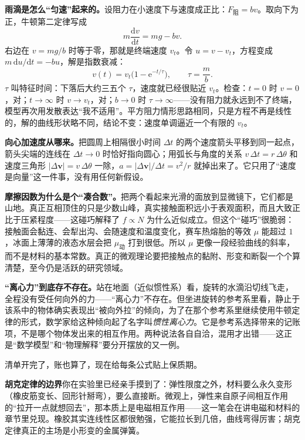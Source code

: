 \begin{mathbridge}
\textbf{雨滴是怎么“匀速”起来的。}设阻力在小速度下与速度成正比：\(F_{\text{阻}}=bv\)。取向下为正，牛顿第二定律写成
\[
m\frac{\mathrm dv}{\mathrm dt}=mg-bv .
\]
右边在 \(v=mg/b\) 时等于零，那就是终端速度 \(v_t\)。令 \(u=v-v_t\)，方程变成 \(m\,\mathrm du/\mathrm dt=-bu\)，解是指数衰减：
\[
v(t)=v_t\bigl(1-\mathrm e^{-t/\tau}\bigr),\qquad \tau=\frac{m}{b}.
\]
\(\tau\) 叫特征时间：下落后大约三五个 \(\tau\)，速度就已经很贴近 \(v_t\)。检查：\(t=0\) 时 \(v=0\)，对；\(t\to\infty\) 时 \(v\to v_t\)，对；\(b\to0\) 时 \(\tau\to\infty\)——没有阻力就永远到不了终端，模型再次用发散表达“我不适用”。平方阻力情形思路相同，只是方程不再是线性的，解的曲线形状略不同，结论不变：速度单调逼近一个有限的 \(v_t\)。

\textbf{向心加速度从哪来。}把圆周上相隔很小时间 \(\Delta t\) 的两个速度箭头平移到同一起点，箭头尖端的连线在 \(\Delta t\to0\) 时恰好指向圆心；用弧长与角度的关系 \(v\,\Delta t=r\,\Delta\theta\) 和速度三角形 \(|\Delta\bm v|=v\,\Delta\theta\) 一除，\(a=|\Delta\bm v|/\Delta t=v^2/r\) 就掉出来了。它只用了“速度是向量”这一件事，没有用任何新假设。
\end{mathbridge}

\begin{challenge}
\textbf{摩擦因数为什么是个“凑合数”。}把两个看起来光滑的面放到显微镜下，它们都是山地。真正互相顶住的只是少数山峰，真实接触面积远小于表观面积，而且大致正比于压紧程度——这碰巧解释了 \(f\propto N\) 为什么近似成立。但这个“碰巧”很脆弱：接触面会黏连、会犁出沟、会随速度和温度变化，赛车热熔胎的等效 \(\mu\) 能超过 \(1\)，冰面上薄薄的液态水层会把 \(\mu_{\text{动}}\) 打到很低。所以 \(\mu\) 更像一段经验曲线的斜率，而不是材料的基本常数。真正的微观理论要把接触点的黏附、形变和断裂一个个算清楚，至今仍是活跃的研究领域。

\textbf{“离心力”到底存不存在。}站在地面（近似惯性系）看，旋转的水滴沿切线飞走，全程没有受任何向外的力——“离心力”不存在。但坐进旋转的参考系里看，静止于该系中的物体确实表现出“被向外拉”的倾向，为了在那个参考系里继续使用牛顿定律的形式，数学家给这种倾向起了名字叫\emph{惯性离心力}。它是参考系选择带来的记账项，不是哪个物体发出来的相互作用。两种说法各自自洽，混用才出错——这正是“数学模型”和“物理解释”要分开摆放的又一例。
\end{challenge}


清单开完了，账也算了，现在给每条公式贴上保质期。

\textbf{胡克定律的边界}你在实验里已经亲手摸到了：弹性限度之外，材料要么永久变形（橡皮筋变长、回形针掰弯），要么直接断。微观上，弹性来自原子间相互作用的“拉开一点就想回去”，那本质上是电磁相互作用——这一笔会在讲电磁和材料的章节里兑现。橡胶其实连线性区都很勉强，它能拉长到几倍，曲线弯得厉害；胡克定律真正的主场是小形变的金属弹簧。

